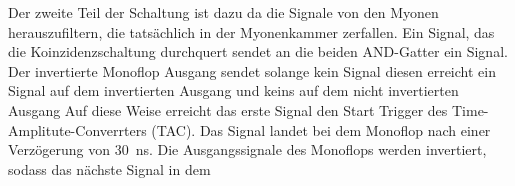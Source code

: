 Der zweite Teil der Schaltung ist dazu da die Signale von den Myonen herauszufiltern, die tatsächlich
in der Myonenkammer zerfallen. Ein Signal, das die Koinzidenzschaltung durchquert
sendet an die beiden AND-Gatter ein Signal. Der invertierte Monoflop Ausgang sendet solange kein
Signal diesen erreicht ein Signal auf dem invertierten Ausgang und keins auf dem nicht invertierten Ausgang
Auf diese Weise erreicht das erste Signal den Start Trigger des Time-Amplitute-Converrters (TAC).
Das Signal landet bei dem Monoflop nach einer Verzögerung von \qty{30}{\ns}. 
Die Ausgangssignale des Monoflops werden invertiert, sodass das nächste Signal in dem 


